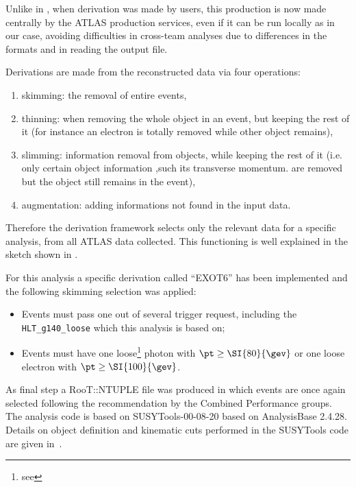 Unlike in \RunOne, when derivation was made by users, this production is now made centrally by the ATLAS production services, even if it can be run locally as in our case, avoiding difficulties in cross-team analyses due to differences in the formats and in reading the output file.

Derivations are made from the reconstructed data via four operations:
\begin{enumerate}
\item skimming: the removal of entire events,
\item thinning: when removing the whole object in an event, but keeping the rest of it (for instance an electron is totally removed while other object remains),
\item slimming: information removal from objects, while keeping the rest of it (i.e. only certain object information ,such its transverse momentum. are removed but the object still remains in the event),
\item augmentation: adding informations not found in the input data.
\end{enumerate}

Therefore the derivation framework selects only the relevant data for a specific analysis, from all ATLAS data collected. This functioning is well explained in the sketch shown in \Fig{\ref{fig:derivation}}.

For this analysis a specific derivation called ``EXOT6'' has been implemented and the following skimming selection was applied:
\begin{itemize}
\item Events must pass one out of several trigger request, including the \verb!HLT_g140_loose! which this analysis is based on;
\item Events must have one loose\footnote{see \Sect{\ref{photons}}} photon with $\pt\ge\SI{80}{\gev}$ or one loose electron with $\pt\ge\SI{100}{\gev}$.
\end{itemize}

As final step a RooT::NTUPLE file was produced in which events are once again selected following the recommendation by the Combined Performance groups. The analysis code is based on SUSYTools-00-08-20 based on AnalysisBase 2.4.28. Details on object definition and kinematic cuts performed in the SUSYTools code are given in~\cite{twiki:SUSYTools}.


